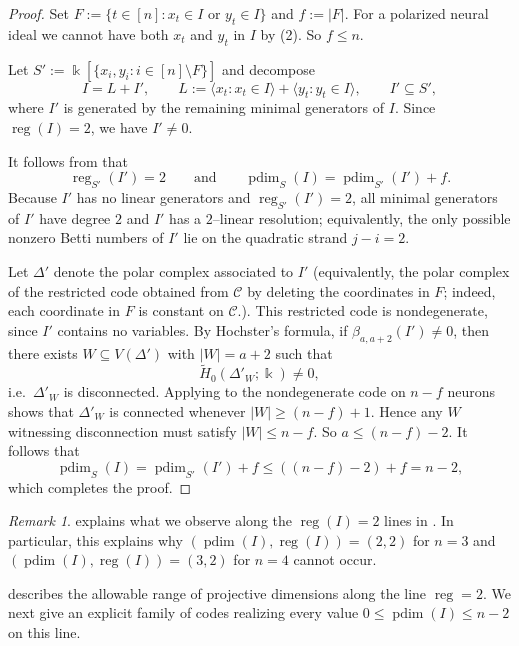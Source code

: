 \documentclass[12pt]{amsart}
\theoremstyle{remark}
\newtheorem{remark}[theorem]{Remark}
\theoremstyle{definition}
\DeclareMathOperator{\reg}{reg}
\DeclareMathOperator{\pd}{pdim}
\newcommand{\C}{\mathcal{C}}
\begin{document}
\begin{proof}
Set $F:=\{t\in[n]: x_t\in I \text{ or } y_t\in I\}$ and $f:=|F|$.  For a polarized neural ideal we cannot have both $x_t$ and $y_t$ in $I$ by (2). So $f\le n$.

Let $S':=\Bbbk[\{x_i,y_i : i\in[n]\setminus F\}]$
and decompose
\[
I=L+I',\qquad 
L:=\langle x_t : x_t\in I\rangle+\langle y_t : y_t\in I\rangle,\qquad I'\subseteq S',
\]
where $I'$ is generated by the remaining minimal generators of $I$.  Since $\reg(I)=2$, we have $I'\neq 0$.


It follows from  that
\[
\reg_{S'}(I')=2
\qquad\text{and}\qquad
\pd_S(I)=\pd_{S'}(I')+f.
\]
Because $I'$ has no linear generators and $\reg_{S'}(I')=2$, all minimal generators of $I'$ have degree $2$
and $I'$ has a $2$--linear resolution; equivalently, the only possible nonzero Betti numbers of $I'$ lie on
the quadratic strand $j-i=2$.

Let $\Delta'$ denote the polar complex associated to $I'$ (equivalently, the polar complex of the restricted code obtained from $\C$ by deleting the coordinates in $F$; indeed, each coordinate in $F$ is constant on $\C$.).  This restricted code is nondegenerate, since $I'$
contains no variables.  By Hochster's formula, if $\beta_{a,a+2}(I')\neq 0$, then there exists
$W\subseteq V(\Delta')$ with $|W|=a+2$ such that
\[
\widetilde H_0(\Delta'_W;\Bbbk)\neq 0,
\]
i.e.\ $\Delta'_W$ is disconnected.  Applying  to the nondegenerate code on
$n-f$ neurons shows that $\Delta'_W$ is connected whenever $|W|\ge (n-f)+1$.  Hence any $W$ witnessing
disconnection must satisfy $|W|\le n-f$. So $a\le (n-f)-2$.  It follows that
\[
\pd_S(I)=\pd_{S'}(I')+f \le ((n-f)-2)+f = n-2,
\]
which completes the proof.
\end{proof}




\begin{remark}
  explains what we observe along the $\reg (I)=2$ lines in . In particular, this explains why  $(\pd  (I),\reg  (I))=(2,2)$ for $n=3$ and $(\pd (I),\reg (I))=(3,2)$  for  $n=4$ cannot occur.
\end{remark}




 describes the allowable range of projective dimensions along the line $\reg=2$. We next give an explicit family of codes realizing every value $0\le \pd (I)\le n-2$ on this line.
\end{document}
